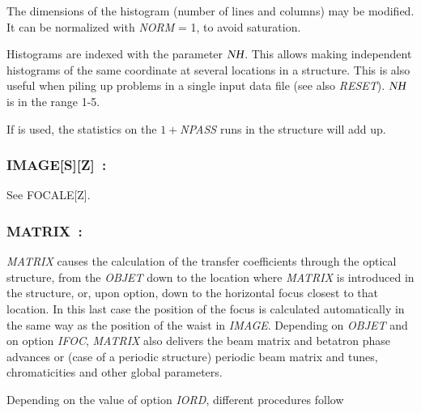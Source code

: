 {\noindent The dimensions of the histogram (number of lines and columns) may be
modified. It can be normalized with \textsl{NORM} = 1, to avoid saturation.  
\medskip

\noindent Histograms are indexed with the parameter  $\textsl{NH}$.  This allows making
independent histograms of the same coordinate at several locations 
in a structure.  This is also useful when piling up problems in a single input data 
file  (see also \textsl{RESET}). $\textsl{NH}$ is in the range 1-5.  
\medskip

\noindent If \REBELOTE{} is used, the statistics on the $1+$\textsl{NPASS}
runs in the structure will add up. 



\newpage

\subsubsection{IMAGE[S][Z]~: \IMAGESZTitl}
\medskip 

\noindent See FOCALE[Z]. 


\vfill



\newpage

\subsubsection{MATRIX~: \MATRIXTitl}\label{MATRIX}   
\medskip

\textsl{MATRIX}  causes the calculation of the transfer coefficients through the optical 
structure, from the \textsl{OBJET} down to the location where \textsl{MATRIX}  is introduced in the structure, or, 
upon option, down to the horizontal focus closest to that location.  
In this last case the position of 
the focus is calculated automatically in the same way as the position of the 
waist in \textsl{IMAGE}. Depending on \textsl{OBJET} and on option \textsl{IFOC},  \textsl{MATRIX} also
delivers the beam matrix and betatron phase advances or (case of a periodic structure) periodic beam matrix and tunes, 
chromaticities  and other global parameters. 



\medskip

\noindent Depending on the value of option \textsl{IORD}, different procedures follow   

\medskip

}
